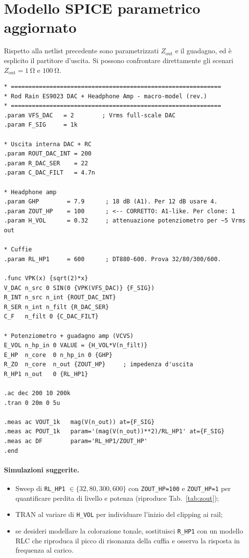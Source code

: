 \section{Modello SPICE parametrico aggiornato}
Rispetto alla netlist precedente sono parametrizzati $Z_{\text{out}}$ e il
guadagno, ed è esplicito il partitore d'uscita. Si possono confrontare
direttamente gli scenari $Z_{\text{out}}=\SI{1}{\ohm}$ e
$\SI{100}{\ohm}$.

\begin{lstlisting}[caption={Netlist SPICE aggiornata (Z\_out parametrico, G da 18 dB)},label={lst:spice}]
* ============================================================
* Rod Rain ES9023 DAC + Headphone Amp - macro-model (rev.)
* ============================================================
.param VFS_DAC   = 2        ; Vrms full-scale DAC
.param F_SIG     = 1k

* Uscita interna DAC + RC
.param ROUT_DAC_INT = 200
.param R_DAC_SER    = 22
.param C_DAC_FILT   = 4.7n

* Headphone amp
.param GHP        = 7.9      ; 18 dB (A1). Per 12 dB usare 4.
.param ZOUT_HP    = 100      ; <-- CORRETTO: A1-like. Per clone: 1
.param H_VOL      = 0.32     ; attenuazione potenziometro per ~5 Vrms out

* Cuffie
.param RL_HP1     = 600      ; DT880-600. Prova 32/80/300/600.

.func VPK(x) {sqrt(2)*x}
V_DAC n_src 0 SIN(0 {VPK(VFS_DAC)} {F_SIG})
R_INT n_src n_int {ROUT_DAC_INT}
R_SER n_int n_filt {R_DAC_SER}
C_F   n_filt 0 {C_DAC_FILT}

* Potenziometro + guadagno amp (VCVS)
E_VOL n_hp_in 0 VALUE = {H_VOL*V(n_filt)}
E_HP  n_core  0 n_hp_in 0 {GHP}
R_ZO  n_core  n_out {ZOUT_HP}     ; impedenza d'uscita
R_HP1 n_out   0 {RL_HP1}

.ac dec 200 10 200k
.tran 0 20m 0 5u

.meas ac VOUT_1k   mag(V(n_out)) at={F_SIG}
.meas ac POUT_1k   param='(mag(V(n_out))**2)/RL_HP1' at={F_SIG}
.meas ac DF        param='RL_HP1/ZOUT_HP'
.end
\end{lstlisting}

\paragraph{Simulazioni suggerite.}
\begin{itemize}
  \item Sweep di \verb|RL_HP1| $\in\{32,80,300,600\}$ con
        \verb|ZOUT_HP=100| e \verb|ZOUT_HP=1| per quantificare perdita di
        livello e potenza (riproduce Tab.~\ref{tab:zout});
  \item TRAN al variare di \verb|H_VOL| per individuare l'inizio del
        clipping ai rail;
  \item se desideri modellare la colorazione tonale, sostituisci
        \verb|R_HP1| con un modello RLC che riproduca il picco di
        risonanza della cuffia e osserva la risposta in frequenza al
        carico.
\end{itemize}

